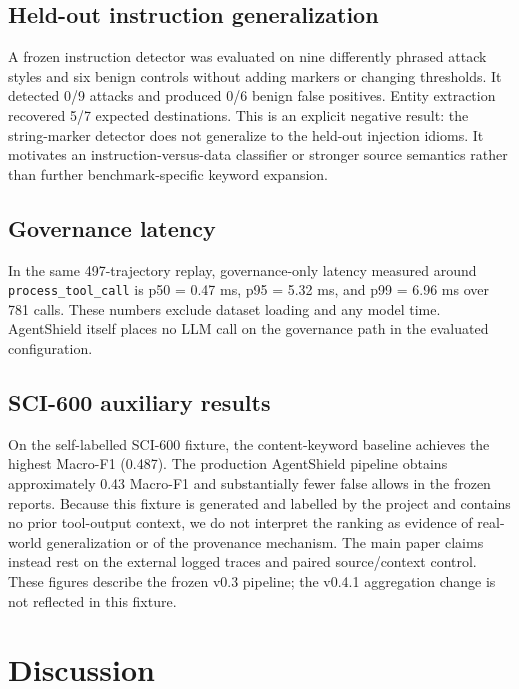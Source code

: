 \documentclass[letterpaper,twocolumn,10pt]{article}
\begin{document}
\subsection{Held-out instruction generalization}
\label{sec:heldout}

A frozen instruction detector was evaluated on nine differently phrased attack
styles and six benign controls without adding markers or changing thresholds.
It detected 0/9 attacks and produced 0/6 benign false positives. Entity
extraction recovered 5/7 expected destinations. This is an explicit negative
result: the string-marker detector does not generalize to the held-out
injection idioms. It motivates an instruction-versus-data classifier or stronger
source semantics rather than further benchmark-specific keyword expansion.

\subsection{Governance latency}
\label{sec:latency}

In the same 497-trajectory replay, governance-only latency measured around
\texttt{process\_tool\_call} is p50 = 0.47 ms, p95 = 5.32 ms, and p99 = 6.96 ms
over 781 calls. These numbers exclude dataset loading and any model time.
AgentShield itself places no LLM call on the governance path in the evaluated
configuration.

\subsection{SCI-600 auxiliary results}
\label{sec:sci600result}

On the self-labelled SCI-600 fixture, the content-keyword baseline achieves the
highest Macro-F1 (0.487). The production AgentShield pipeline obtains
approximately 0.43 Macro-F1 and substantially fewer false allows in the frozen
reports. Because this fixture is generated and labelled by the project and
contains no prior tool-output context, we do not interpret the ranking as
evidence of real-world generalization or of the provenance mechanism. The main
paper claims instead rest on the external logged traces and paired
source/context control. These figures describe the frozen v0.3 pipeline; the
v0.4.1 aggregation change is not reflected in this fixture.

\section{Discussion}
\label{sec:discussion}
\end{document}
